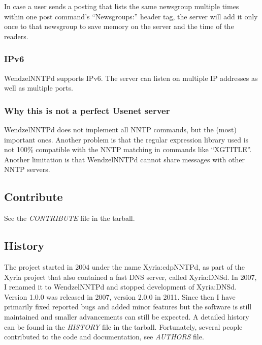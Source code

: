 \documentclass[12pt,fleqn,leqno]{scrbook}
\begin{document}
In case a user sends a posting that lists the same newsgroup multiple
times within one post command's ``Newsgroups:'' header tag, the server
will add it only once to that newsgroup to save memory on the server and
the time of the readers.

\hypertarget{ipv6-1}{%
\subsubsection{IPv6}\label{ipv6-1}}

WendzelNNTPd supports IPv6. The server can listen on multiple IP
addresses as well as multiple ports.

\hypertarget{why-this-is-not-a-perfect-usenet-server-1}{%
\subsubsection{Why this is not a perfect Usenet
server}\label{why-this-is-not-a-perfect-usenet-server-1}}

WendzelNNTPd does not implement all NNTP commands, but the (most)
important ones. Another problem is that the regular expression library
used is not 100\% compatible with the NNTP matching in commands like
``XGTITLE''. Another limitation is that WendzelNNTPd cannot share
messages with other NNTP servers.

\hypertarget{contribute-1}{%
\subsection{Contribute}\label{contribute-1}}

See the \emph{CONTRIBUTE} file in the tarball.

\hypertarget{history-1}{%
\subsection{History}\label{history-1}}

The project started in 2004 under the name Xyria:cdpNNTPd, as part of
the Xyria project that also contained a fast DNS server, called
Xyria:DNSd. In 2007, I renamed it to WendzelNNTPd and stopped
development of Xyria:DNSd. Version 1.0.0 was released in 2007, version
2.0.0 in 2011. Since then I have primarily fixed reported bugs and added
minor features but the software is still maintained and smaller
advancements can still be expected. A detailed history can be found in
the \emph{HISTORY} file in the tarball. Fortunately, several people
contributed to the code and documentation, see \emph{AUTHORS} file.
\end{document}
